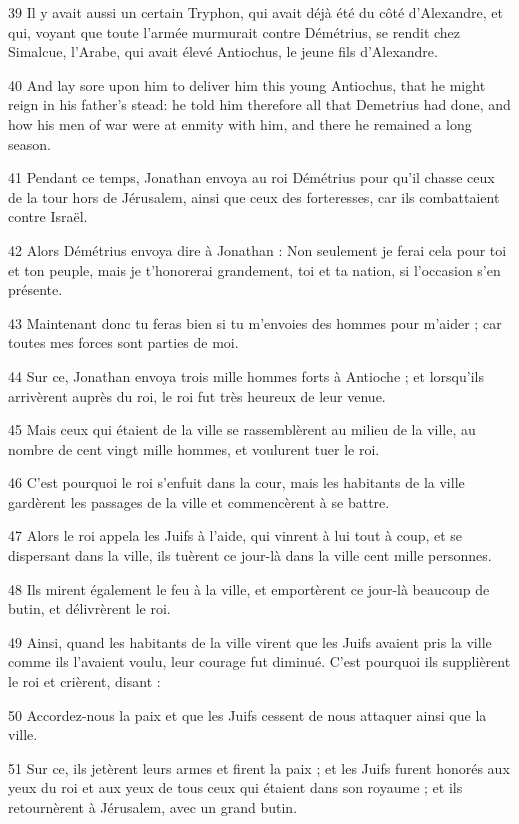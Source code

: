 \par 39 Il y avait aussi un certain Tryphon, qui avait déjà été du côté d'Alexandre, et qui, voyant que toute l'armée murmurait contre Démétrius, se rendit chez Simalcue, l'Arabe, qui avait élevé Antiochus, le jeune fils d'Alexandre.
\par 40 And lay sore upon him to deliver him this young Antiochus, that he might reign in his father's stead: he told him therefore all that Demetrius had done, and how his men of war were at enmity with him, and there he remained a long season.
\par 41 Pendant ce temps, Jonathan envoya au roi Démétrius pour qu'il chasse ceux de la tour hors de Jérusalem, ainsi que ceux des forteresses, car ils combattaient contre Israël.
\par 42 Alors Démétrius envoya dire à Jonathan : Non seulement je ferai cela pour toi et ton peuple, mais je t'honorerai grandement, toi et ta nation, si l'occasion s'en présente.
\par 43 Maintenant donc tu feras bien si tu m'envoies des hommes pour m'aider ; car toutes mes forces sont parties de moi.
\par 44 Sur ce, Jonathan envoya trois mille hommes forts à Antioche ; et lorsqu'ils arrivèrent auprès du roi, le roi fut très heureux de leur venue.
\par 45 Mais ceux qui étaient de la ville se rassemblèrent au milieu de la ville, au nombre de cent vingt mille hommes, et voulurent tuer le roi.
\par 46 C'est pourquoi le roi s'enfuit dans la cour, mais les habitants de la ville gardèrent les passages de la ville et commencèrent à se battre.
\par 47 Alors le roi appela les Juifs à l'aide, qui vinrent à lui tout à coup, et se dispersant dans la ville, ils tuèrent ce jour-là dans la ville cent mille personnes.
\par 48 Ils mirent également le feu à la ville, et emportèrent ce jour-là beaucoup de butin, et délivrèrent le roi.
\par 49 Ainsi, quand les habitants de la ville virent que les Juifs avaient pris la ville comme ils l'avaient voulu, leur courage fut diminué. C'est pourquoi ils supplièrent le roi et crièrent, disant :
\par 50 Accordez-nous la paix et que les Juifs cessent de nous attaquer ainsi que la ville.
\par 51 Sur ce, ils jetèrent leurs armes et firent la paix ; et les Juifs furent honorés aux yeux du roi et aux yeux de tous ceux qui étaient dans son royaume ; et ils retournèrent à Jérusalem, avec un grand butin.
